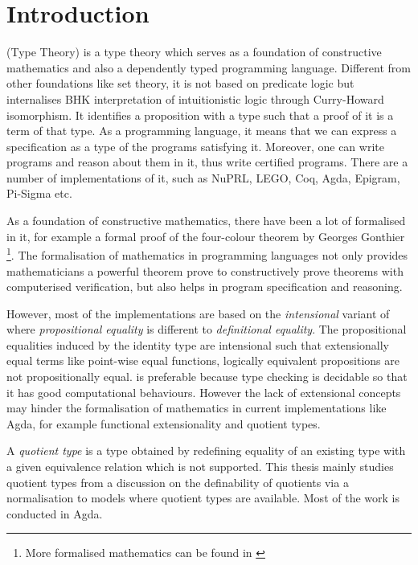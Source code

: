 \chapter{Introduction}

\mltt (Type Theory) is a type theory which serves as a foundation of constructive mathematics and also a dependently typed programming language. Different from other foundations like set theory, it is not based on predicate logic but internalises BHK interpretation of intuitionistic logic through Curry-Howard isomorphism. It identifies a proposition with a type such that a proof of it is a term of that type. 
As a programming language, it means that we can express a specification as a type of the programs satisfying it.
Moreover, one can write programs and reason about them in it, thus write certified programs. There are a number of implementations of it, such as NuPRL, LEGO, Coq, Agda, Epigram, Pi-Sigma etc.


As a foundation of constructive mathematics, there have been a lot of \maths formalised in it, for example a formal proof of the four-colour theorem by Georges Gonthier \cite{gonthier08ams} \footnote{More formalised mathematics can be found in \cite{sbfm}}. The formalisation of mathematics in programming languages not only provides mathematicians a powerful theorem prove to constructively prove theorems with computerised verification, but also helps in program specification and reasoning. 






However, most of the implementations are based on the \emph{intensional} variant of \mltt where \emph{propositional equality} is different to \emph{definitional equality}. The propositional equalities induced by the identity type are intensional such that extensionally equal terms like point-wise equal functions, logically equivalent propositions are not propositionally equal. \itt is preferable because type checking is decidable so that it has good computational behaviours. However the lack of extensional concepts may hinder the formalisation of mathematics in current implementations like Agda, for example functional extensionality and quotient types.







A \emph{quotient type} is a type obtained by redefining equality of an existing type with a given equivalence relation which is not supported. This thesis mainly studies quotient types from a discussion on the definability of quotients via a normalisation to models where quotient types are available. Most of the work is conducted in Agda.







